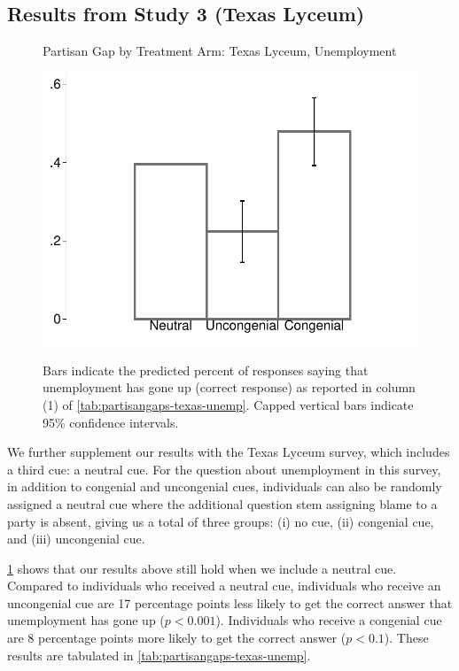 \documentclass[12pt, letterpaper]{article}
\begin{document}
\subsection*{Results from Study 3 (Texas Lyceum)}
\begin{figure}[!t]
	\centering
	\caption{Partisan Gap by Treatment Arm: Texas Lyceum, Unemployment}
	\includegraphics[width=.55\textwidth]{../figs/texas-unemp-congenialcue.pdf}
	\label{fig:partisangaps-texas-unemp}
	\caption*{\footnotesize 
		Bars indicate the predicted percent of responses saying that unemployment has gone up (correct response) as reported in column (1) of \cref{tab:partisangaps-texas-unemp}.  
		Capped vertical bars indicate 95\% confidence intervals.
	}
\end{figure}

We further supplement our results with the Texas Lyceum survey, which includes a third cue: a neutral cue. For the question about unemployment in this survey, in addition to congenial and uncongenial cues, individuals can also be randomly assigned a neutral cue where the additional question stem assigning blame to a party is absent, giving us a total of three groups: (i) no cue, (ii) congenial cue, and (iii) uncongenial cue.

\cref{fig:partisangaps-texas-unemp} shows that our results above still hold when we include a neutral cue. Compared to individuals who received a neutral cue, individuals who receive an uncongenial cue are 17 percentage points less likely to get the correct answer that unemployment has gone up ($p<0.001$). Individuals who receive a congenial cue are 8 percentage points more likely to get the correct answer ($p<0.1$). These results are tabulated in \cref{tab:partisangaps-texas-unemp}.
\end{document}
